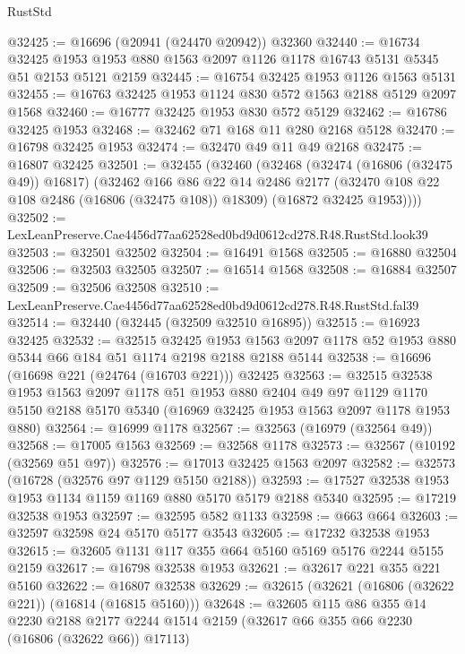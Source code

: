 \begin{lexlean}{RustStd}
\begin{coremodule}
@32425 := @16696 (@20941 (@24470 @20942)) @32360
@32440 := @16734
    @32425
    @1953
    @1953
    @880
    @1563
    @2097
    @1126
    @1178
    @16743
    @5131
    @5345
    @51
    @2153
    @5121
    @2159
@32445 := @16754 @32425 @1953 @1126 @1563 @5131
@32455 := @16763 @32425 @1953 @1124 @830 @572 @1563 @2188 @5129 @2097 @1568
@32460 := @16777 @32425 @1953 @830 @572 @5129
@32462 := @16786 @32425 @1953
@32468 := @32462 @71 @168 @11 @280 @2168 @5128
@32470 := @16798 @32425 @1953
@32474 := @32470 @49 @11 @49 @2168
@32475 := @16807 @32425
@32501 := @32455
    (@32460
      (@32468
        (@32474 (@16806 (@32475 @49)) @16817)
        (@32462
          @166
          @86
          @22
          @14
          @2486
          @2177
          (@32470 @108 @22 @108 @2486 (@16806 (@32475 @108)) @18309)
          (@16872 @32425 @1953))))
@32502 := LexLeanPreserve.Cae4456d77aa62528ed0bd9d0612cd278.R48.RustStd.look39
@32503 := @32501 @32502
@32504 := @16491 @1568
@32505 := @16880 @32504
@32506 := @32503 @32505
@32507 := @16514 @1568
@32508 := @16884 @32507
@32509 := @32506 @32508
@32510 := LexLeanPreserve.Cae4456d77aa62528ed0bd9d0612cd278.R48.RustStd.fal39
@32514 := @32440 (@32445 (@32509 @32510 @16895))
@32515 := @16923 @32425
@32532 := @32515
    @32425
    @1953
    @1563
    @2097
    @1178
    @52
    @1953
    @880
    @5344
    @66
    @184
    @51
    @1174
    @2198
    @2188
    @2188
    @5144
@32538 := @16696 (@16698 @221 (@24764 (@16703 @221))) @32425
@32563 := @32515
    @32538
    @1953
    @1563
    @2097
    @1178
    @51
    @1953
    @880
    @2404
    @49
    @97
    @1129
    @1170
    @5150
    @2188
    @5170
    @5340
    (@16969 @32425 @1953 @1563 @2097 @1178 @1953 @880)
@32564 := @16999 @1178
@32567 := @32563 (@16979 (@32564 @49))
@32568 := @17005 @1563
@32569 := @32568 @1178
@32573 := @32567 (@10192 (@32569 @51 @97))
@32576 := @17013 @32425 @1563 @2097
@32582 := @32573 (@16728 (@32576 @97 @1129 @5150 @2188))
@32593 := @17527 @32538 @1953 @1953 @1134 @1159 @1169 @880 @5170 @5179 @2188 @5340
@32595 := @17219 @32538 @1953
@32597 := @32595 @582 @1133
@32598 := @663 @664
@32603 := @32597 @32598 @24 @5170 @5177 @3543
@32605 := @17232 @32538 @1953
@32615 := @32605 @1131 @117 @355 @664 @5160 @5169 @5176 @2244 @5155 @2159
@32617 := @16798 @32538 @1953
@32621 := @32617 @221 @355 @221 @5160
@32622 := @16807 @32538
@32629 := @32615 (@32621 (@16806 (@32622 @221)) (@16814 (@16815 @5160)))
@32648 := @32605
    @115
    @86
    @355
    @14
    @2230
    @2188
    @2177
    @2244
    @1514
    @2159
    (@32617 @66 @355 @66 @2230 (@16806 (@32622 @66)) @17113)

\end{coremodule}
\end{lexlean}
